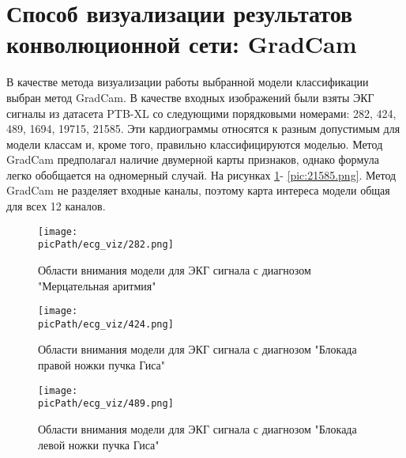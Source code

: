 \documentclass[oneside,final,14pt]{extreport}
\newcommand{\picPath}{img}
\begin{document}
\section{Способ визуализации результатов конволюционной сети: GradCam}
В качестве метода визуализации работы выбранной модели классификации выбран метод GradCam. В качестве входных изображений были взяты ЭКГ сигналы из датасета PTB-XL со следующими порядковыми номерами: 282, 424, 489, 1694, 19715, 21585. Эти кардиограммы относятся к разным  допустимым для модели классам и, кроме того, правильно классифицируются моделью. Метод GradCam предполагал наличие двумерной карты признаков, однако формула легко обобщается на одномерный случай. На рисунках   \ref{pic:282.png}- \ref{pic:21585.png}. Метод GradCam не разделяет входные каналы, поэтому карта интереса модели общая для всех 12 каналов. 

\begin{figure}[H]
\begin{center}
\texttt{[image: \\picPath/ecg\_viz/282.png]}
\end{center}
  \caption{Области внимания модели для ЭКГ сигнала с диагнозом "Мерцательная аритмия"}
  \label{pic:282.png}
\end{figure}
\newpage
\begin{figure}[H]
\begin{center}
\texttt{[image: \\picPath/ecg\_viz/424.png]}
\end{center}
  \caption{Области внимания модели для ЭКГ сигнала с диагнозом "Блокада правой ножки пучка Гиса"}

\end{figure}
\newpage
\begin{figure}[H]
\begin{center}
\texttt{[image: \\picPath/ecg\_viz/489.png]}
\end{center}
  \caption{Области внимания модели для ЭКГ сигнала с диагнозом "Блокада левой ножки пучка Гиса"}

\end{figure}
\newpage
\end{document}
